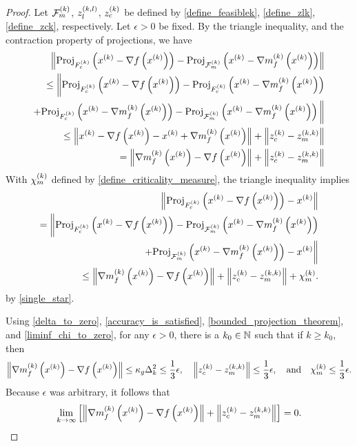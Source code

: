 \vspace{1cm}
\begin{proof}

Let 
${\mathcal F_m^{(k)}}$, ${z_l^{(k, l)}}$, ${z_c^{(k)}}$
be defined by 
\cref{define_feasiblek}, \cref{define_zlk}, \cref{define_zck},
respectively.
Let $\epsilon > 0$ be fixed.
By the triangle inequality, and the contraction property of projections, we have
\begin{align}\left \|
 {\textrm{Proj}}_{{F_c^{(k)}}}\left(x^{(k)} - \nabla f\left(x^{(k)}\right)\right)
-{\textrm{Proj}}_{{\mathcal F_m^{(k)}}}\left(x^{(k)} - {\nabla m_f^{(k)}\left(x^{(k)}\right)} \right)
\right\| \nonumber \\
\le 
\bigg \|
 {\textrm{Proj}}_{{F_c^{(k)}}}\left(x^{(k)} - \nabla f\left(x^{(k)}\right)\right) 
-{\textrm{Proj}}_{{F_c^{(k)}}}\left(x^{(k)} - {\nabla m_f^{(k)}\left(x^{(k)}\right)} \right) \nonumber \\
+{\textrm{Proj}}_{{F_c^{(k)}}}\left(x^{(k)} - {\nabla m_f^{(k)}\left(x^{(k)}\right)} \right)
-{\textrm{Proj}}_{{\mathcal F_m^{(k)}}}\left(x^{(k)} - {\nabla m_f^{(k)}\left(x^{(k)}\right)} \right)
\bigg\| \nonumber \\
\le \left\|
x^{(k)} - \nabla f\left(x^{(k)}\right) - x^{(k)} + {\nabla m_f^{(k)}\left(x^{(k)}\right)}
\right\| + \left\|{z_c^{(k)}} - {z_m^{(k, k)}}\right\| \nonumber \\
= \left\|{\nabla m_f^{(k)}\left(x^{(k)}\right)} - \nabla f\left(x^{(k)}\right)\right\| + \left\|{z_c^{(k)}} - {z_m^{(k, k)}}\right\| \label{single_star}
\end{align}
With ${\chi_m^{(k)}}$ defined by \cref{define_criticality_measure}, the triangle inequality implies
\begin{align*}
\left\|{\textrm{Proj}}_{{F_c^{(k)}}}\left(x^{(k)} - \nabla f\left(x^{(k)}\right)\right) - x^{(k)} \right\| \\
= \bigg\|
 {\textrm{Proj}}_{{F_c^{(k)}}}\left(x^{(k)} - \nabla f\left(x^{(k)}\right)\right)
-{\textrm{Proj}}_{{\mathcal F_m^{(k)}}}\left(x^{(k)} - {\nabla m_f^{(k)}\left(x^{(k)}\right)} \right) \\
+{\textrm{Proj}}_{{\mathcal F_m^{(k)}}}\left(x^{(k)} - {\nabla m_f^{(k)}\left(x^{(k)}\right)} \right)
- x^{(k)}\bigg\| \\
\le \left\|{\nabla m_f^{(k)}\left(x^{(k)}\right)} - \nabla f\left(x^{(k)}\right)\right\| + \left\|{z_c^{(k)}} - {z_m^{(k, k)}}\right\| + {\chi_m^{(k)}}.
\end{align*}
by \cref{single_star}.


Using \cref{delta_to_zero}, \cref{accuracy_is_satisfied}, \cref{bounded_projection_theorem}, and \cref{liminf_chi_to_zero},
for any $\epsilon > 0$, there is a $k_0 \in \mathbb N$ such that if $k \ge k_0$, then
\begin{align*}
\left\|{\nabla m_f^{(k)}\left(x^{(k)}\right)} - \nabla f\left(x^{(k)}\right)\right\| \le \kappa_g \Delta_k^2 \le \frac 1 3 \epsilon,
\quad
\left\|{z_c^{(k)}} - {z_m^{(k, k)}}\right\| \le \frac 1 3 \epsilon,
\quad \textrm{and} \quad
{\chi_m^{(k)}} \le \frac 1 3 \epsilon.
\end{align*}
Because $\epsilon$ was arbitrary, it follows that
\begin{align*}
\lim_{k\to\infty} \left[\left\|{\nabla m_f^{(k)}\left(x^{(k)}\right)} - \nabla f\left(x^{(k)}\right)\right\| + \left\|{z_c^{(k)}} - {z_m^{(k, k)}}\right\|\right] = 0.
\end{align*}
\end{proof}

